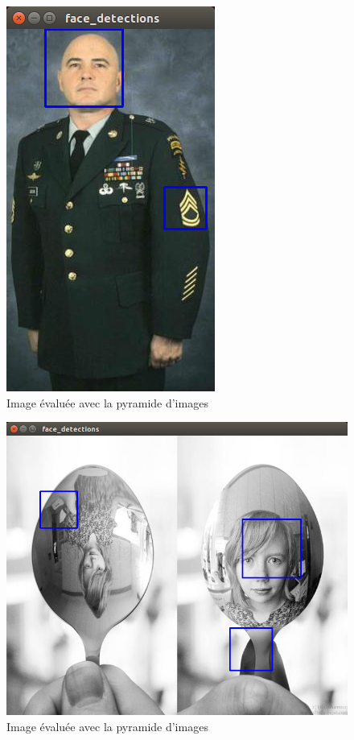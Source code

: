 \documentclass[a4paper,11pt]{article}
\begin{document}
	\begin{figure}[H]
	    \centering
	    \includegraphics[scale=0.3]{scale_3.png}
	    \caption{Image évaluée avec la pyramide d'images}
	    \label{fig:scale_3}
	\end{figure}
	\begin{figure}[H]
	    \centering
	    \includegraphics[scale=0.3]{last_scale.png}
	    \caption{Image évaluée avec la pyramide d'images}
	    \label{fig:last_scale}
	\end{figure}
\end{document}
